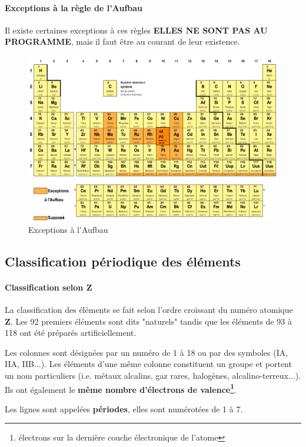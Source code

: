 \documentclass[10pt,a4paper]{book}
\begin{document}
\paragraph{Exceptions à la règle de l'Aufbau} Il existe certaines exceptions à ces règles \textbf{ELLES NE SONT PAS AU PROGRAMME}, mais il faut être au courant de leur existence.
\begin{figure}[h!]
\begin{center}
\includegraphics[scale=0.45]{./assets/aufbau_exceptions.png}
\end{center}
\caption{Exceptions à l'Aufbau}
\label{fig:exceptions}
\end{figure}
\newpage
\subsection{Classification périodique des éléments}
\paragraph{Classification selon Z} La classification des éléments se fait selon l'ordre croissant du numéro atomique \textbf{Z}. Les 92 premiers éléments sont dits "naturels" tandis que les éléments de 93 à 118 ont été préparés artificiellement. \par
Les colonnes sont désignées par un numéro de 1 à 18 ou par des symboles (IA, IIA, IIB...). Les éléments d'une même colonne constituent un groupe et portent un nom particuliers (i.e. métaux alcalins, gaz rares, halogènes, alcalino-terreux...). Ils ont également le \textbf{même nombre d'électrons de valence\footnote{électrons sur la dernière couche électronique de l'atome}}. \par 
Les lignes sont appelées \textbf{périodes}, elles sont numérotées de 1 à 7.
\end{document}
